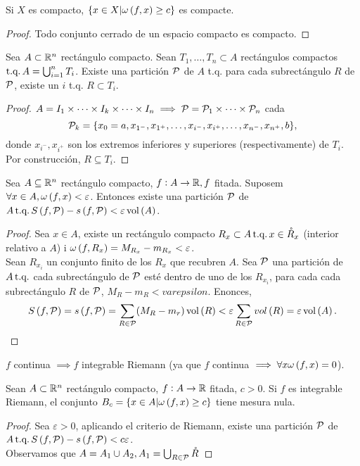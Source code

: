 \begin{col*}
    Si $X$ es compacto, $\{x \in X | \omega \left( f, x \right) \geq c\}$ es compacte.
\end{col*}
\begin{proof}
    Todo conjunto cerrado de un espacio compacto es compacto.
\end{proof}
\begin{lema}
    Sea $A \subset \mathbb{R}^n$ rectángulo compacto. Sean $T_1, \dots, T_n \subset A$ rectángulos compactos $\operatorname{\text{t.q.}} A = \bigcup_{i=1}^n T_i$. Existe una partición $\mathcal{P}$ de $A$ t.q. para cada subrectángulo $R$ de $\mathcal{P}$, existe un $i$ t.q. $R \subset T_i$.
\end{lema}
\begin{proof}
    $A = I_1 \times \dots \times I_k \times \dots \times I_n \implies \mathcal{P} = \mathcal{P}_1 \times \dots \times \mathcal{P}_n$ cada
    \[ \mathcal{P}_k = \{x_0 = a, x_{1^-}, x_{1^+}, \dots, x_{i^-}, x_{i^+}, \dots, x_{n^-}, x_{n^+}, b\}, \]
    donde $x_{i^-}, x_{i^+}$ son los extremos inferiores y superiores (respectivamente) de $T_i$. Por construcción, $R \subseteq T_i$.
\end{proof}
\begin{lema*}
    Sea $A \subseteq \mathbb{R}^n$ rectángulo compacto, $f : A \to \mathbb{R}, f$ fitada. Suposem $\forall x  \in A, \omega \left( f, x \right) < \varepsilon$. Entonces existe una partición $\mathcal{P}$ de $A \operatorname{\text{t.q.}} S \left( f, \mathcal{P} \right) - s \left( f, \mathcal{P} \right) < \varepsilon \operatorname{vol} \left( A \right)$.
\end{lema*}
\begin{proof}
    Sea $x \in A$, existe un rectángulo compacto $R_x \subset A \operatorname{\text{t.q.}} x \in \mathring{R}_x$ (interior relativo a $A$) i $\omega \left( f, R_x \right) = M_{R_x} - m_{R_x} < \varepsilon$. \\
    Sean $R_{x_i}$ un conjunto finito de los $R_x$ que recubren $A$. Sea $\mathcal{P}$ una partición de $A \operatorname{\text{t.q.}}$ cada subrectángulo de $\mathcal{P}$ esté dentro de uno de los $R_{x_i}$, para cada cada subrectángulo $R$ de $\mathcal{P}$, $M_R - m_R < varepsilon$. Enonces,
    \[ S \left( f,\mathcal{P} \right) = s \left( f,\mathcal{P} \right) = \sum_{R \in \mathcal{P}} (M_R - m_r) \operatorname{vol} \left( R \right) < \varepsilon \sum_{R \in \mathcal{P}} vol \left( R \right) = \varepsilon \operatorname{vol} \left( A \right). \]
\end{proof}
\begin{col*}
    $f$ continua $\implies f$ integrable Riemann (ya que $f$ continua $\implies \forall x \omega \left( f, x \right) = 0$).
\end{col*}
\begin{lema*}
    Sean $A \subset \mathbb{R}^n$ rectángulo compacto, $f : A \to \mathbb{R}$ fitada, $c > 0$. Si $f$ es integrable Riemann, el conjunto $B_c = \{x \in A | \omega \left( f, x \right) \geq c\}$ tiene mesura nula.
\end{lema*}
\begin{proof}
    Sea $\varepsilon > 0$, aplicando el criterio de Riemann, existe una partición $\mathcal{P}$ de $A \operatorname{\text{t.q.}} S \left( f, \mathcal{P} \right) - s \left( f, \mathcal{P} \right) < c\varepsilon$. \\
    Observamos que $A = A_1 \cup A_2, A_1 = \bigcup_{R \in \mathcal{P}} \mathring{R}$
\end{proof}















